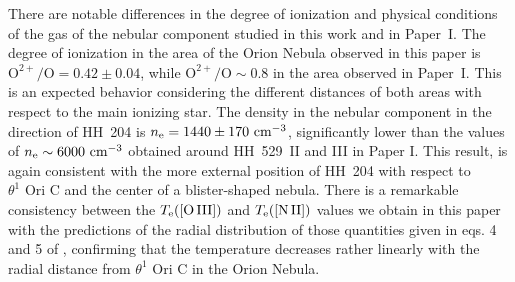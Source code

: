 \documentclass[twocolumn]{aastex63}
\begin{document}
There are notable differences in the degree of ionization and physical conditions of the gas of the nebular component studied in this work and in Paper~I. The degree of ionization in the area of the Orion Nebula observed in this paper is  $\text{O}^{2+}/\text{O}=0.42 \pm 0.04$, while $\text{O}^{2+}/\text{O} \sim 0.8$ in the area observed in Paper~I. This is an expected behavior considering the different distances of both areas with respect to the main ionizing star. The density in the nebular component in the direction of HH~204 is $n_{\rm e}=1440 \pm 170 \text{ cm}^{-3}$, significantly lower than the values of $n_{\rm e}\sim 6000\text{ cm}^{-3}$ obtained around HH~529~II and III in Paper I. This result, is again consistent with the more external position of HH~204 with respect to $\theta^{1} \text{ Ori C}$ and the center of a blister-shaped nebula. There is a remarkable consistency between the $T_{\rm e}(\text{[O\thinspace III]})$ and $T_{\rm e}(\text{[N\thinspace II]})$ values we obtain in this paper with the predictions of the radial distribution of those quantities given in eqs. 4 and 5 of  \citet{mesadelgado08}, confirming that the temperature decreases rather linearly with the radial distance from $\theta^{1} \text{ Ori C}$ in the Orion Nebula. 
\end{document}
